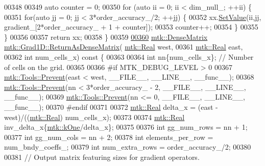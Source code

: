\begin{DoxyCode}
{{00348 
00349   \textcolor{keyword}{auto} counter = 0;
00350   \textcolor{keywordflow}{for} (\textcolor{keyword}{auto} ii = 0; ii < dim\_null\_; ++ii) \{
00351     \textcolor{keywordflow}{for}(\textcolor{keyword}{auto} jj = 0; jj < 3*order\_accuracy\_/2; ++jj) \{
00352       xx.\hyperlink{classmtk_1_1DenseMatrix_ae0f873a6d3a734da467cafb817da64ae}{SetValue}(ii,jj, gradient\_[2*order\_accuracy\_ + 1 + counter]);
00353       counter++;
00354     \}
00355   \}
00356 
00357   \textcolor{keywordflow}{return} xx;
00358 \}
00359 
\hypertarget{mtk__grad__1d_8cc_source_l00360}{}\hyperlink{classmtk_1_1Grad1D_a77b2eddbe4ab03f469306c604d505b1a}{00360} \hyperlink{classmtk_1_1DenseMatrix}{mtk::DenseMatrix} \hyperlink{classmtk_1_1Grad1D_a77b2eddbe4ab03f469306c604d505b1a}{mtk::Grad1D::ReturnAsDenseMatrix}(
      \hyperlink{group__c01-roots_gac080bbbf5cbb5502c9f00405f894857d}{mtk::Real} west,
00361                                                   \hyperlink{group__c01-roots_gac080bbbf5cbb5502c9f00405f894857d}{mtk::Real} east,
00362                                                   \textcolor{keywordtype}{int} num\_cells\_x)\textcolor{keyword}{ const }\{
00363 
00364   \textcolor{keywordtype}{int} nn\{num\_cells\_x\}; \textcolor{comment}{// Number of cells on the grid.}
00365 
00366 \textcolor{preprocessor}{  #if MTK\_DEBUG\_LEVEL > 0}
00367   \hyperlink{classmtk_1_1Tools_afe5bb096309258e2e72503fd7b41c7e0}{mtk::Tools::Prevent}(east < west, \_\_FILE\_\_, \_\_LINE\_\_, \_\_func\_\_);
00368   \hyperlink{classmtk_1_1Tools_afe5bb096309258e2e72503fd7b41c7e0}{mtk::Tools::Prevent}(nn < 3*order\_accuracy\_ - 2, \_\_FILE\_\_, \_\_LINE\_\_, \_\_func\_\_);
00369   \hyperlink{classmtk_1_1Tools_afe5bb096309258e2e72503fd7b41c7e0}{mtk::Tools::Prevent}(nn <= 0, \_\_FILE\_\_, \_\_LINE\_\_, \_\_func\_\_);
00370 \textcolor{preprocessor}{  #endif}
00371 
00372   \hyperlink{group__c01-roots_gac080bbbf5cbb5502c9f00405f894857d}{mtk::Real} delta\_x = (east - west)/((\hyperlink{group__c01-roots_gac080bbbf5cbb5502c9f00405f894857d}{mtk::Real}) num\_cells\_x);
00373 
00374   \hyperlink{group__c01-roots_gac080bbbf5cbb5502c9f00405f894857d}{mtk::Real} inv\_delta\_x\{\hyperlink{group__c01-roots_ga26407c24d43b6b95480943340d285c71}{mtk::kOne}/delta\_x\};
00375 
00376   \textcolor{keywordtype}{int} gg\_num\_rows = nn + 1;
00377   \textcolor{keywordtype}{int} gg\_num\_cols = nn + 2;
00378   \textcolor{keywordtype}{int} elements\_per\_row = num\_bndy\_coeffs\_;
00379   \textcolor{keywordtype}{int} num\_extra\_rows = order\_accuracy\_/2;
00380 
00381   \textcolor{comment}{// Output matrix featuring sizes for gradient operators.}
}}
\end{DoxyCode}
